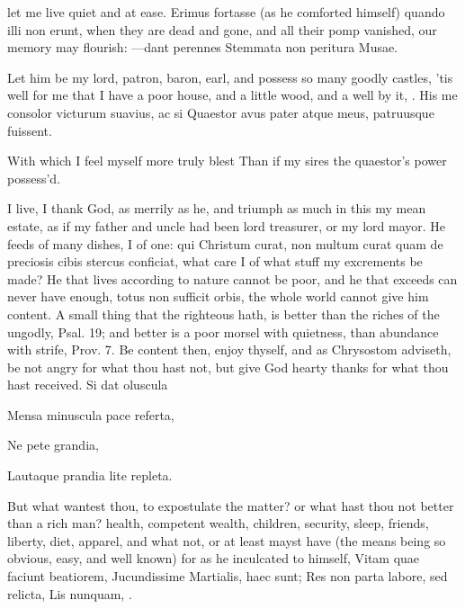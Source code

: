 {let me live quiet and at ease. Erimus fortasse (as he comforted
himself) quando illi non erunt, when they are dead and gone, and all
their pomp vanished, our memory may flourish:
---dant perennes
Stemmata non peritura Musae.

Let him be my lord, patron, baron, earl, and possess so many goodly
castles, 'tis well for me that I have a poor house, and a little
wood, and a well by it, \etc{}.
His me consolor victurum suavius, ac si
Quaestor avus pater atque meus, patruusque fuissent.

With which I feel myself more truly blest
Than if my sires the quaestor's power possess'd.

I live, I thank God, as merrily as he, and triumph as much in this my
mean estate, as if my father and uncle had been lord treasurer, or my
lord mayor. He feeds of many dishes, I of one: qui Christum
curat, non multum curat quam de preciosis cibis stercus conficiat, what
care I of what stuff my excrements be made? He that lives
according to nature cannot be poor, and he that exceeds can never have
enough, totus non sufficit orbis, the whole world cannot give him
content. A small thing that the righteous hath, is better than the
riches of the ungodly, Psal.  19; and better is a poor morsel
with quietness, than abundance with strife, Prov.  7. Be content
then, enjoy thyself, and as  Chrysostom adviseth, be not angry
for what thou hast not, but give God hearty thanks for what thou hast
received.
Si dat oluscula

Mensa minuscula
pace referta,

Ne pete grandia,

Lautaque prandia
lite repleta.

But what wantest thou, to expostulate the matter? or what hast thou not
better than a rich man? health, competent wealth, children,
security, sleep, friends, liberty, diet, apparel, and what not, or at
least mayst have (the means being so obvious, easy, and well known) for
as he inculcated to himself,
Vitam quae faciunt beatiorem,
Jucundissime Martialis, haec sunt;
Res non parta labore, sed relicta,
Lis nunquam, \etc{}.

}
